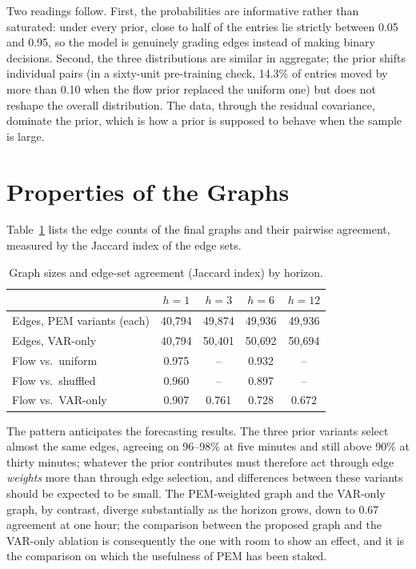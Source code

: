 \documentclass[MTech]{ugthesis}
\begin{document}
Two readings follow. First, the probabilities are informative rather than saturated: under every prior, close to half of the entries lie strictly between 0.05 and 0.95, so the model is genuinely grading edges instead of making binary decisions. Second, the three distributions are similar in aggregate; the prior shifts individual pairs (in a sixty-unit pre-training check, 14.3\% of entries moved by more than 0.10 when the flow prior replaced the uniform one) but does not reshape the overall distribution. The data, through the residual covariance, dominate the prior, which is how a prior is supposed to behave when the sample is large.

\section{Properties of the Graphs}
Table~\ref{tab:graphs} lists the edge counts of the final graphs and their pairwise agreement, measured by the Jaccard index of the edge sets.

\begin{table}[htpb]
\small
\renewcommand{\arraystretch}{1.4}
\centering
\caption{Graph sizes and edge-set agreement (Jaccard index) by horizon.}
\label{tab:graphs}
\begin{tabular}{|p{5.6cm}|c|c|c|c|}
\hline
 & $h=1$ & $h=3$ & $h=6$ & $h=12$ \\ \hline
Edges, PEM variants (each) & 40{,}794 & 49{,}874 & 49{,}936 & 49{,}936 \\ \hline
Edges, VAR-only & 40{,}794 & 50{,}401 & 50{,}692 & 50{,}694 \\ \hline
Flow vs.\ uniform & 0.975 & -- & 0.932 & -- \\ \hline
Flow vs.\ shuffled & 0.960 & -- & 0.897 & -- \\ \hline
Flow vs.\ VAR-only & 0.907 & 0.761 & 0.728 & 0.672 \\ \hline
\end{tabular}
\end{table}

The pattern anticipates the forecasting results. The three prior variants select almost the same edges, agreeing on 96--98\% at five minutes and still above 90\% at thirty minutes; whatever the prior contributes must therefore act through edge \emph{weights} more than through edge selection, and differences between these variants should be expected to be small. The PEM-weighted graph and the VAR-only graph, by contrast, diverge substantially as the horizon grows, down to 0.67 agreement at one hour; the comparison between the proposed graph and the VAR-only ablation is consequently the one with room to show an effect, and it is the comparison on which the usefulness of PEM has been staked.
\end{document}
